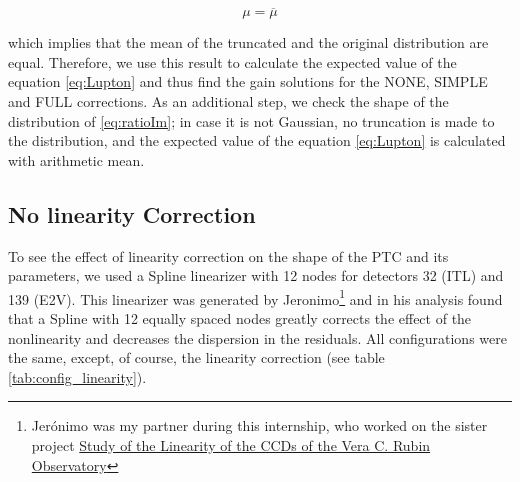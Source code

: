 \begin{itemize}
\begin{equation}
    \mu = \overline{\mu}
    \label{eq:truncated_dist_simetric}
\end{equation}

which implies that the mean of the truncated and the original distribution are equal. Therefore, we use this result to calculate the expected value of the equation \ref{eq:Lupton} and thus find the gain solutions for the NONE, SIMPLE and FULL corrections. As an additional step, we check the shape of the distribution of \ref{eq:ratioIm}; in case it is not Gaussian, no truncation is made to the distribution, and the expected value of the equation \ref{eq:Lupton} is calculated with arithmetic mean. 

\end{itemize}


\subsection{No linearity Correction} \label{subsec:method_Linearity}

To see the effect of linearity correction on the shape of the PTC and its parameters, we used a Spline linearizer with 12 nodes for detectors 32 (ITL) and 139 (E2V). This linearizer was generated by Jeronimo\footnote{Jerónimo was my partner during this internship, who worked on the sister project \href{https://github.com/jerocalderong/LinearityRubinObservatoryCCDs/blob/main/Linearity_of_the_Vera_Rubin_Observatory_CCDs_Prelim.pdf}{Study of the Linearity of the CCDs of the Vera C. Rubin Observatory}} and in his analysis found that a Spline with 12 equally spaced nodes greatly corrects the effect of the nonlinearity and decreases the dispersion in the residuals. All configurations were the same, except, of course, the linearity correction (see table \ref{tab:config_linearity}).


\begin{table}[!htb]
\centering
\caption{Configuration used to generate the PTCs. The linearity correction is performed in this case, ``doLinearize: true''.}
\label{tab:config_linearity}
\end{table}

